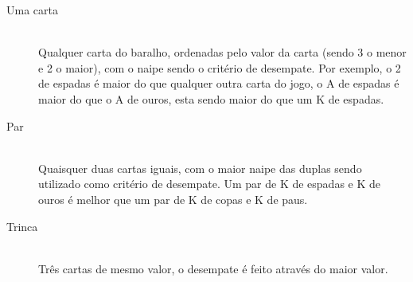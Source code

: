 \documentclass[12pt]{article}
\begin{document}
\begin{description}

\item[Uma carta] \hfill \\
 Qualquer carta do baralho, ordenadas pelo valor da carta (sendo 3 o menor e 2 o maior), com o naipe sendo o critério de desempate. Por exemplo, o 2 de espadas é maior do que qualquer outra carta do jogo, o A de espadas é maior do que o A de ouros, esta sendo maior do que um K de espadas.

\vspace{0.4 true cm}

\item[Par] \hfill \\
 Quaisquer duas cartas iguais, com o maior naipe das duplas sendo utilizado como critério de desempate. Um par de K de espadas e K de ouros é melhor que um par de K de copas e K de paus.

\vspace{0.4 true cm}

\item[Trinca] \hfill \\
 Três cartas de mesmo valor, o desempate é feito através do maior valor.

\vspace{0.4 true cm}


\end{description}
\end{document}
